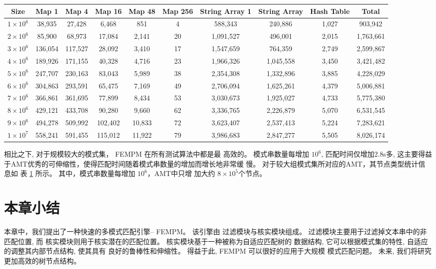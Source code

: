 \begin{table}[!htp]
  \centering
  \footnotesize
  \label{tab:large_group}
  \begin{tabular}{cccccccccc}
 \hline
 Size &
 Map 1 &
 Map 4 &
 Map 16 &
 Map 48 &
 Map 256 &
 String Array 1&
 String Array   &
 Hash Table &
 Total\\
\hline
$1 \times 10^6$ &  38,935 &   27,428  &   6,468 &     851   &    4 &    588,343  &    240,886 &  1,027 &    903,942  \\
$2 \times 10^6$ &  85,900 &   68,973  &  17,084 &   2,141   &   20 &  1,091,527  &    496,001 &  2,015 &  1,763,661  \\
$3 \times 10^6$ & 136,054 &  117,527  &  28,092 &   3,410   &   17 &  1,547,659  &    764,359 &  2,749 &  2,599,867  \\
$4 \times 10^6$ & 189,926 &  171,155  &  40,328 &   4,716   &   23 &  1,966,326  &  1,045,558 &  3,450 &  3,421,482  \\
$5 \times 10^6$ & 247,707 &  230,163  &  83,043 &   5,989   &  38 &  2,354,308   &  1,332,896 &  3,885 &  4,228,029  \\
$6 \times 10^6$ & 304,863 &  293,591  &  65,475 &   7,169   &   49 &  2,706,094  &  1,625,261 &  4,379 &  5,006,881  \\
$7 \times 10^6$ & 366,861 &  361,695  &  77,899 &   8,434   &   53 &  3,030,673  &  1,925,027 &  4,733 &  5,775,380  \\
$8 \times 10^6$ & 429,121 &  433,708  &  90,280 &   9,660   &   62 &  3,336,765  &  2,226,879 &  5,070 &  6,531,545  \\
$9 \times 10^6$ & 494,278 &  509,992  & 102,402 &  10,833   &   72 &  3,623,407  &  2,537,413 &  5,224 &  7,283,621  \\
$1 \times 10^7$ & 558,241 &  591,455  & 115,012 &  11,922   &   79 &  3,986,683  &  2,847,277 &  5,505 &  8,026,174  \\
\hline
\end{tabular}
\end{table}

相比之下, 对于规模较大的模式集， \textsf{FEMPM} 在所有测试算法中都是最
高效的。 模式串数量每增加 $10^6$, 匹配时间仅增加2.8s多, 这主要得益
于AMT优秀的可伸缩性，使得匹配时间随着模式串数量的增加而增长地非常缓
慢。 对于较大组模式集所对应的AMT，其节点类型统计信息如
表 \ref{tab:large_group} 所示。 其中，模式串数量每增加 $10^6$，AMT中只增
加大约 $8 \times 10^5$个节点。

\section{本章小结}
\label{sec:2_conclusion}

本章中，我们提出了一种快速的多模式匹配引擎-- \textsf{FEMPM}。 该引擎由
过滤模块与核实模块组成。 过滤模块主要用于过滤掉文本串中的非匹配位置, 而
核实模块则用于核实潜在的匹配位置。 核实模块基于一种被称为自适应匹配树的
数据结构, 它可以根据模式集的特性, 自适应的调整其内部节点结构, 使其具有
良好的鲁棒性和伸缩性。 得益于此, \textsf{FEMPM} 可以很好的应用于大规模
模式匹配问题。 未来, 我们将研究更加高效的树节点结构。
